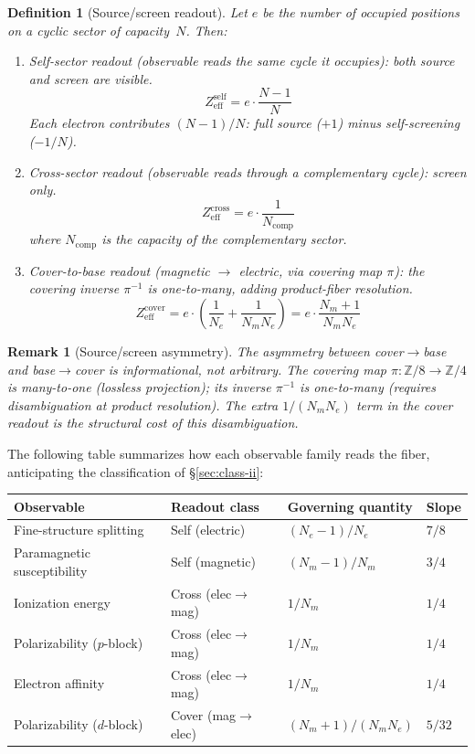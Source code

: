 \documentclass[11pt,a4paper]{article}
\newtheorem{definition}[theorem]{Definition}
\newtheorem{remark}[theorem]{Remark}
\begin{document}
\begin{definition}[Source/screen readout]
\label{def:source-screen}
Let $e$ be the number of occupied positions on a cyclic sector of capacity~$N$. Then:
\begin{enumerate}[label=(\roman*)]
\item \emph{Self-sector readout} (observable reads the same cycle it occupies): both source and screen are visible.
\[
Z_{\mathrm{eff}}^{\mathrm{self}} = e \cdot \frac{N-1}{N}
\]
Each electron contributes $(N-1)/N$: full source ($+1$) minus self-screening ($-1/N$).

\item \emph{Cross-sector readout} (observable reads through a complementary cycle): screen only.
\[
Z_{\mathrm{eff}}^{\mathrm{cross}} = e \cdot \frac{1}{N_{\mathrm{comp}}}
\]
where $N_{\mathrm{comp}}$ is the capacity of the complementary sector.

\item \emph{Cover-to-base readout} (magnetic $\to$ electric, via covering map $\pi$): the covering inverse $\pi^{-1}$ is one-to-many, adding product-fiber resolution.
\[
Z_{\mathrm{eff}}^{\mathrm{cover}} = e \cdot \left(\frac{1}{N_e} + \frac{1}{N_m N_e}\right) = e \cdot \frac{N_m + 1}{N_m N_e}
\]
\end{enumerate}
\end{definition}

\begin{remark}[Source/screen asymmetry]
The asymmetry between cover$\to$base and base$\to$cover is informational, not arbitrary. The covering map $\pi: \mathbb{Z}/8 \to \mathbb{Z}/4$ is many-to-one (lossless projection); its inverse $\pi^{-1}$ is one-to-many (requires disambiguation at product resolution). The extra $1/(N_m N_e)$ term in the cover readout is the structural cost of this disambiguation.
\end{remark}

The following table summarizes how each observable family reads the fiber, anticipating the classification of \S\ref{sec:class-ii}:

\begin{center}
\renewcommand{\arraystretch}{1.15}
\begin{tabular}{llll}
\toprule
Observable & Readout class & Governing quantity & Slope \\
\midrule
Fine-structure splitting & Self (electric) & $(N_e{-}1)/N_e$ & $7/8$ \\
Paramagnetic susceptibility & Self (magnetic) & $(N_m{-}1)/N_m$ & $3/4$ \\
Ionization energy & Cross (elec$\to$mag) & $1/N_m$ & $1/4$ \\
Polarizability ($p$-block) & Cross (elec$\to$mag) & $1/N_m$ & $1/4$ \\
Electron affinity & Cross (elec$\to$mag) & $1/N_m$ & $1/4$ \\
Polarizability ($d$-block) & Cover (mag$\to$elec) & $(N_m{+}1)/(N_m N_e)$ & $5/32$ \\
\bottomrule
\end{tabular}
\end{center}
\end{document}
